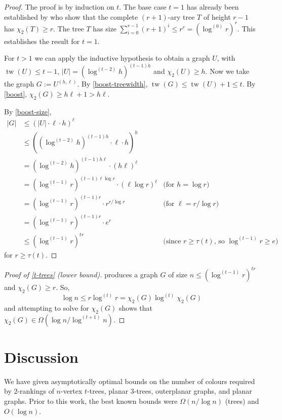 \documentclass[kpfonts]{patmorin}
\DeclareMathOperator{\tw}{tw}
\newcommand{\trn}{\chi_2}
\theoremstyle{named}
\begin{document}
\begin{proof}
    The proof is by induction on $t$.  The base case $t=1$ has already been established by \citet{karpas.neiman.ea:on} who show that the complete $(r+1)$-ary tree $T$ of height $r-1$ has $\trn(T)\ge r$.  The tree $T$ has size $\sum_{i=0}^{r-1} (r+1)^i \le r^r=(\log^{(0)}r)^{r}$.  This establishes the result for $t=1$.

    For $t>1$ we can apply the inductive hypothesis to obtain a graph $U$,     with $\tw(U)\le t-1$, $|U|=(\log^{(t-2)} h)^{(t-1)h}$ and $\trn(U)\ge h$.
    Now we take the graph $G:=U^{(h,\ell)}$.  By \cref{boost-treewidth}, $\tw(G)\le \tw(U)+1\le t$.  By \cref{boost},
    $\trn(G)\ge h\ell+1 > h\ell$.

   By \cref{boost-size},
   \begin{align*}
        |G| & \le (|U|\cdot\ell\cdot h)^{\ell} \\
        & \le \left((\log^{(t-2)} h)^{(t-1)h}\cdot\ell\cdot h\right)^{h} \\
        & = (\log^{(t-2)} h)^{(t-1)h\ell}\cdot (h\ell)^{\ell} \\
        & = (\log^{(t-1)} r)^{(t-1)\ell\log r}\cdot (\ell\log r)^{\ell}
        & \text{(for $h=\log r$)}\\
        & = (\log^{(t-1)} r)^{(t-1)r}\cdot r^{r/\log r}
        & \text{(for $\ell = r/\log r$)}\\
        & = (\log^{(t-1)} r)^{(t-1)r}\cdot e^{r} \\
        & \le (\log^{(t-1)} r)^{tr} & \text{(since $r\ge \tau(t)$, so $\log^{(t-1)} r\ge e$)}
   \end{align*}
   for $r\ge \tau(t)$.
\end{proof}

\begin{proof}[Proof of \cref{t-trees} (lower bound)]
     produces a graph $G$ of size $n \le (\log^{(t-1)} r)^{tr}$ and $\trn(G)\ge r$.  So,
    \[  \log n \le r\log^{(t)} r = \trn(G)\log^{(t)} \trn(G)\]
    and attempting to solve for $\trn(G)$ shows that $\trn(G)\in \Omega(\log n/\log^{(t+1)} n)$.
\end{proof}


\section{Discussion}
\label{conclusion}

We have given asymptotically optimal bounds on the number of colours required by $2$-rankings of $n$-vertex $t$-trees, planar 3-trees, outerplanar graphs, and planar graphs.  Prior to this work, the best known bounds were $\Omega(n/\log n)$ (trees) and $O(\log n)$.
\end{document}
